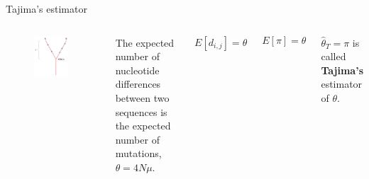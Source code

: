 \begin{frame}{Tajima's estimator}

	\begin{columns}


                \begin{figure}
                        \includegraphics[width=0.9\textwidth]{Pics/tau}
                \end{figure}


		The expected number of nucleotide differences between two sequences is the expected 
		number of mutations, $\theta=4N\mu$.

		\begin{equation}
			E[d_{i,j}] = \theta
		\end{equation}

		\begin{equation}
			E[\pi] = \theta
		\end{equation}

		$\hat{\theta}_T = \pi$ is called \textbf{Tajima's} estimator of $\theta$.

        \end{columns}

\end{frame}


